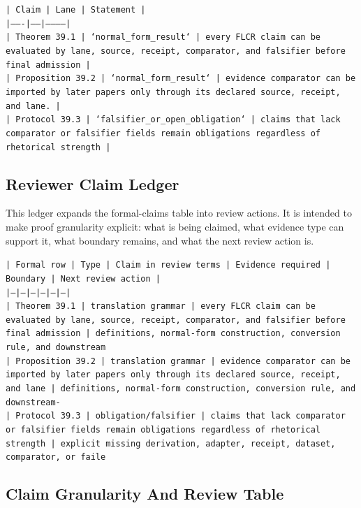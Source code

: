 \documentclass[11pt]{article}
\begin{document}
\noindent\texttt{| Claim | Lane | Statement |}\\
\noindent\texttt{|-------|------|-----------|}\\
\noindent\texttt{| Theorem 39.1 | `normal\_form\_result` | every FLCR claim can be evaluated by lane, source, receipt, comparator, and falsifier before final admission |}\\
\noindent\texttt{| Proposition 39.2 | `normal\_form\_result` | evidence comparator can be imported by later papers only through its declared source, receipt, and lane. |}\\
\noindent\texttt{| Protocol 39.3 | `falsifier\_or\_open\_obligation` | claims that lack comparator or falsifier fields remain obligations regardless of rhetorical strength |}\\

\subsection*{Reviewer Claim Ledger}

This ledger expands the formal-claims table into review actions. It is intended to make proof granularity explicit: what is being claimed, what evidence type can support it, what boundary remains, and what the next review action is.

\noindent\texttt{| Formal row | Type | Claim in review terms | Evidence required | Boundary | Next review action |}\\
\noindent\texttt{|---|---|---|---|---|---|}\\
\noindent\texttt{| Theorem 39.1 | translation grammar | every FLCR claim can be evaluated by lane, source, receipt, comparator, and falsifier before final admission | definitions, normal-form construction, conversion rule, and downstream}\\
\noindent\texttt{| Proposition 39.2 | translation grammar | evidence comparator can be imported by later papers only through its declared source, receipt, and lane | definitions, normal-form construction, conversion rule, and downstream-}\\
\noindent\texttt{| Protocol 39.3 | obligation/falsifier | claims that lack comparator or falsifier fields remain obligations regardless of rhetorical strength | explicit missing derivation, adapter, receipt, dataset, comparator, or faile}\\

\subsection*{Claim Granularity And Review Table}
\end{document}
